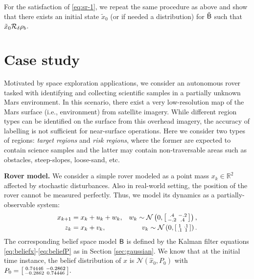 \documentclass{ifacconf}
\begin{document}
For the satisfaction of \eqref{eq:sr-1}, we repeat the same procedure as above and show that there exists an initial state $\tilde x_{0}$ (or if needed a distribution) for $\tilde {\mathsf{B}}$ such that  $\tilde x_{0} \relax\mathcal{R}_\delta \rho_b$.


\section{Case study}\label{sec:case}
Motivated by space exploration applications, we consider an autonomous rover tasked with identifying and collecting scientific samples in a partially unknown Mars environment. In this scenario, there exist a very low-resolution map of the Mars surface (i.e., environment) from satellite imagery. While different region types can be identified on the surface from this overhead imagery, the accuracy of labelling is not sufficient for near-surface operations. Here we consider two types of regions: \emph{target regions} and \emph{risk regions}, where the former are expected to contain science samples and the latter may contain non-traversable areas such as obstacles, steep-slopes, loose-sand, etc.

\textbf{Rover model.} We consider a simple rover modeled as a point mass $x_k \in \mathbb{R}^2$ affected by stochastic disturbances. Also in real-world setting, the position of the rover cannot be measured perfectly. Thus, we model its dynamics as a partially-observable system:
\begin{equation*}
\begin{aligned}
  x_{k+1}&= x_{k} + u_k+ w_k,  & w_k \sim \mathcal{N} \left(0,\begin{bsmallmatrix}.4&-.2\\-.2&.4\end{bsmallmatrix}\right), \\
  z_k&= x_k+v_k, &  v_k \sim \mathcal{N} \left(0,\begin{bsmallmatrix}1&.1\\.1&1\end{bsmallmatrix}\right).
\end{aligned}
\end{equation*}
The corresponding belief space model $\mathsf{B}$ is defined by the Kalman filter equations \eqref{eq:beliefx}-\eqref{eq:beliefP} as in Section \ref{sec:gaussian}. We know that at the initial time instance, the belief distribution of $x$ is $\mathcal N(\hat x_0, P_0)$ with $P_0=\begin{bsmallmatrix} 
 0.74446& -0.2862\\
 -0.2862 &  0.74446
\end{bsmallmatrix}. 
 $
\end{document}
